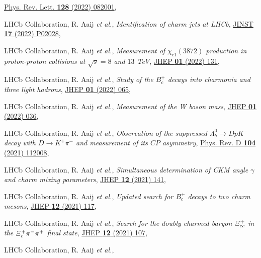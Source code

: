 \begin{cvcontent}
\begin{enumerate}[label={[\arabic*]}, leftmargin=1.5cm]
    \href{https://journals.aps.org/prl/abstract/10.1103/PhysRevLett.128.082001}{Phys. Rev. Lett. \textbf{128} (2022) 082001},
    \item LHCb Collaboration, R. Aaij \emph{et al.}, 
    \emph{Identification of charm jets at LHCb},
    \href{https://doi.org/10.1088/1748-0221/17/02/p02028}{JINST \textbf{17} (2022) P02028},
    \item LHCb Collaboration, R. Aaij \emph{et al.}, 
    \emph{Measurement of $\chi_{c1}(3872)$ production in proton-proton collisions at $\sqrt{s}=8$ and $13$ TeV},
    \href{https://doi.org/10.1007/JHEP01(2022)131}{JHEP \textbf{01} (2022) 131},
    \item LHCb Collaboration, R. Aaij \emph{et al.}, 
    \emph{Study of the $B_c^+$ decays into charmonia and three light hadrons},
    \href{https://doi.org/10.1007/JHEP01(2022)065}{JHEP \textbf{01} (2022) 065},
    \item LHCb Collaboration, R. Aaij \emph{et al.}, 
    \emph{Measurement of the W boson mass}, 
    \href{https://doi.org/10.1007/JHEP01(2022)036}{JHEP \textbf{01} (2022) 036},
    \item LHCb Collaboration, R. Aaij \emph{et al.}, 
    \emph{Observation of the suppressed $\Lambda_b^0\to D p K^-$ decay with $D\to K^+ \pi^-$ and measurement of its $C\!P$ asymmetry}, 
    \href{https://link.aps.org/doi/10.1103/PhysRevD.104.112008}{Phys. Rev. D \textbf{104} (2021) 112008},
    \item LHCb Collaboration, R. Aaij \emph{et al.}, 
    \emph{Simultaneous determination of CKM angle $\gamma$ and charm mixing parameters},
    \href{https://doi.org/10.1007/JHEP12(2021)141}{JHEP \textbf{12} (2021) 141},
    \sloppy
    \item LHCb Collaboration, R. Aaij \emph{et al.}, 
    \emph{Updated search for $B_c^+$ decays to two charm mesons},
    \href{https://doi.org/10.1007/JHEP12(2021)117}{JHEP \textbf{12} (2021) 117},
    \item LHCb Collaboration, R. Aaij \emph{et al.}, 
    \emph{Search for the doubly charmed baryon $\it{\Xi}_{cc}^{+}$ in the $\it{\Xi}_{c}^{+} \pi^{-} \pi^{+}$ final state},
    \href{https://doi.org/10.1007/JHEP12(2021)107}{JHEP \textbf{12} (2021) 107},
    \item LHCb Collaboration, R. Aaij \emph{et al.}, 

\end{enumerate}
\end{cvcontent}
